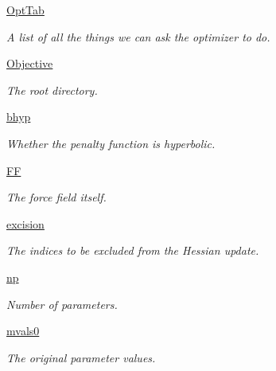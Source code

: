 \begin{DoxyCompactItemize}
\item 
\hyperlink{classforcebalance_1_1optimizer_1_1Optimizer_a30e7e28bf0af3cffc94aa51a58a3d345}{Opt\-Tab}
\begin{DoxyCompactList}\small\item\em A list of all the things we can ask the optimizer to do. \end{DoxyCompactList}\item 
\hyperlink{classforcebalance_1_1optimizer_1_1Optimizer_a485c636c02ff86bb7709a44582c7693e}{Objective}
\begin{DoxyCompactList}\small\item\em The root directory. \end{DoxyCompactList}\item 
\hyperlink{classforcebalance_1_1optimizer_1_1Optimizer_a83d94779674511a9d31b780b07ea54fb}{bhyp}
\begin{DoxyCompactList}\small\item\em Whether the penalty function is hyperbolic. \end{DoxyCompactList}\item 
\hyperlink{classforcebalance_1_1optimizer_1_1Optimizer_a873d6c3dfc5351d162613b596850af75}{F\-F}
\begin{DoxyCompactList}\small\item\em The force field itself. \end{DoxyCompactList}\item 
\hyperlink{classforcebalance_1_1optimizer_1_1Optimizer_a1040c03a6361d782db8bd6a273d445e5}{excision}
\begin{DoxyCompactList}\small\item\em The indices to be excluded from the Hessian update. \end{DoxyCompactList}\item 
\hyperlink{classforcebalance_1_1optimizer_1_1Optimizer_af198da71b849e8e10611bf16ea5914cf}{np}
\begin{DoxyCompactList}\small\item\em Number of parameters. \end{DoxyCompactList}\item 
\hyperlink{classforcebalance_1_1optimizer_1_1Optimizer_aa1d7f33ea1c9341fb1c867ef01752a16}{mvals0}
\begin{DoxyCompactList}\small\item\em The original parameter values. \end{DoxyCompactList}\item 

\end{DoxyCompactItemize}

